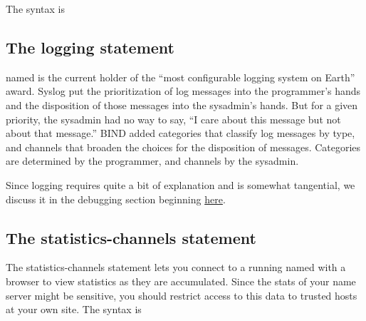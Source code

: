 The syntax is


\protect\hypertarget{part0024_split_042.html}{}{}

\hypertarget{part0024_split_042.htmlux5cux23_idContainer1069}{}
\hypertarget{part0024_split_042.htmlux5cux23calibre_pb_41}{%
\subsection[The {logging}
statement]{\texorpdfstring{\protect\hypertarget{part0024_split_042.htmlux5cux23_idTextAnchor909}{}{}The
{logging}
statement}{The logging statement}}\label{part0024_split_042.htmlux5cux23calibre_pb_41}}

\protect\hypertarget{part0024_split_042.htmlux5cux23_idIndexMarker2182}{}{}{named}
is the current holder of the ``most configurable logging system on
Earth'' award. Syslog put the prioritization of log messages into the
programmer's hands and the disposition of those messages into the
sysadmin's hands. But for a given priority, the sysadmin had no way to
say, ``I care about this message but not about that message.'' BIND
added categories that classify log messages by type, and channels that
broaden the choices for the disposition of messages. Categories are
determined by the programmer, and channels by the sysadmin.

Since logging requires quite a bit of explanation and is somewhat
tangential, we discuss it in the debugging section beginning
\protect\hyperlink{part0024_split_070.htmlux5cux23_idTextAnchor955}{here}.

\protect\hypertarget{part0024_split_043.html}{}{}

\hypertarget{part0024_split_043.htmlux5cux23_idContainer1069}{}
\hypertarget{part0024_split_043.htmlux5cux23calibre_pb_42}{%
\subsection[The {statistics-channels}
statement]{\texorpdfstring{\protect\hypertarget{part0024_split_043.htmlux5cux23_idTextAnchor910}{}{}\protect\hypertarget{part0024_split_043.htmlux5cux23_idIndexMarker2183}{}{}\protect\hypertarget{part0024_split_043.htmlux5cux23_idTextAnchor911}{}{}The
{statistics-channels}
statement}{The statistics-channels statement}}\label{part0024_split_043.htmlux5cux23calibre_pb_42}}

The {statistics-channels} statement lets you connect to a running
{named} with a browser to view statistics as they are accumulated. Since
the stats of your name server might be sensitive, you should restrict
access to this data to trusted hosts at your own site. The syntax is

